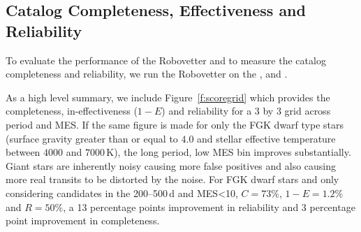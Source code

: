 \subsection{Catalog Completeness, Effectiveness and Reliability}
\label{s:candr}

To evaluate the performance of the Robovetter and to measure the catalog completeness and reliability, we run the Robovetter on the ,  and . 

As a high level summary, we include Figure~\ref{f:scoregrid} which provides the completeness, in-effectiveness ($1-E$) and reliability  for a 3 by 3 grid across period and MES. If the same figure is made for only the FGK dwarf type stars (surface gravity greater than or equal to $4.0$ and stellar effective temperature between $4000$ and $7000$\,K), the long period, low MES bin improves substantially. Giant stars are inherently noisy causing more false positives and also causing more real transits to be distorted by the noise. For FGK dwarf stars and only considering candidates in the 200--500\,d and MES<10, $C=73\%$, $1-E=1.2\%$ and $R=50\%$, a 13 percentage points improvement in reliability and 3 percentage point improvement in completeness. 


